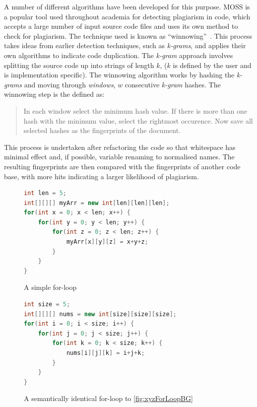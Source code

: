A number of different algorithms have been developed for this purpose.
MOSS is a popular tool used throughout academia for detecting plagiarism
in code, which accepts a large number of input source code files and uses 
its own method to check for plagiarism. The technique used is known as 
``winnowing''~\cite{winnowing}. This process takes ideas from earlier detection
techniques, such as \emph{k-grams}, and applies their own algorithms to indicate
code duplication. The \emph{k-gram} approach involves splitting the source code up into
strings of length $k$, ($k$ is defined by the user and is implementation specific).
The winnowing algorithm works by hashing the \emph{k-grams} and moving through 
\emph{windows}, $w$ consecutive \emph{k-gram} hashes.
The winnowing step is the defined as: 
\begin{quote}In each window select the minimum hash value.
If there is more than one hash with the minimum value, select the rightmost
occurence. Now save all selected hashes as the fingerprints of the document.
\cite{winnowing}
\end{quote}

This process is undertaken after refactoring the code so that whitespace
has minimal effect and, if possible, variable renaming to normalised names.
The resulting fingerprints are then compared with the fingerprints of another
code base, with more hits indicating a larger likelihood of plagiarism.

\begin{figure}[h!]
\begin{minipage}[b]{0.45\linewidth}
\begin{lstlisting}[language=Java]
int len = 5;
int[][][] myArr = new int[len][len][len];
for(int x = 0; x < len; x++) {
	for(int y = 0; y < len; y++) {
		for(int z = 0; z < len; z++) {
			myArr[x][y][z] = x+y+z;
		}
	}
}
\end{lstlisting}
\caption{A simple for-loop}
\label{fig:xyzForLoopBG}
\end{minipage}
\hspace{0.5cm}
\begin{minipage}[b]{0.45\linewidth}
\begin{lstlisting}[language=Java]
int size = 5;
int[][][] nums = new int[size][size][size];
for(int i = 0; i < size; i++) {
	for(int j = 0; j < size; j++) {
		for(int k = 0; k < size; k++) {
			nums[i][j][k] = i+j+k;
		}
	}
}
\end{lstlisting}
\caption{A semantically identical for-loop to \cref{fig:xyzForLoopBG}}
\label{fig:ijkForLoopBG}
\end{minipage}
\end{figure}

